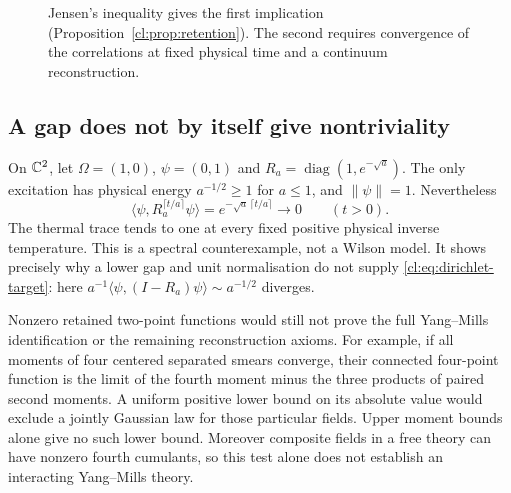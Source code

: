 \begin{figure}[htbp]
\centering
{}
\caption{Jensen's inequality gives the first implication
(Proposition~\ref{cl:prop:retention}). The second requires convergence of
the correlations at fixed physical time and a continuum reconstruction.}
\label{cl:fig:retention}
\end{figure}

\subsection{A gap does not by itself give nontriviality}
On $\mathbb{C}^2$, let $\Omega=(1,0)$, $\psi=(0,1)$ and
$R_a=\operatorname{diag}(1,e^{-\sqrt a})$.
The only excitation has physical energy $a^{-1/2}\ge1$ for $a\le1$,
and $\|\psi\|=1$. Nevertheless
\[
\langle\psi,R_a^{\lceil t/a\rceil}\psi\rangle
=e^{-\sqrt a\,\lceil t/a\rceil}\longrightarrow0
\qquad(t>0).
\]
The thermal trace tends to one at every fixed positive physical
inverse temperature. This is a spectral counterexample, not a Wilson
model. It shows precisely why a lower gap and unit normalisation do
not supply \eqref{cl:eq:dirichlet-target}: here
$a^{-1}\langle\psi,(I-R_a)\psi\rangle\sim a^{-1/2}$ diverges.

Nonzero retained two-point functions would still not prove the full
Yang--Mills identification or the remaining reconstruction axioms.
For example, if all moments of four centered separated smears converge,
their connected four-point function is the limit of the fourth moment
minus the three products of paired second moments. A uniform positive
lower bound on its absolute value would exclude a jointly Gaussian
law for those particular fields. Upper moment bounds alone give no
such lower bound. Moreover composite fields in a free theory can have
nonzero fourth cumulants, so this test alone does not establish an
interacting Yang--Mills theory.

